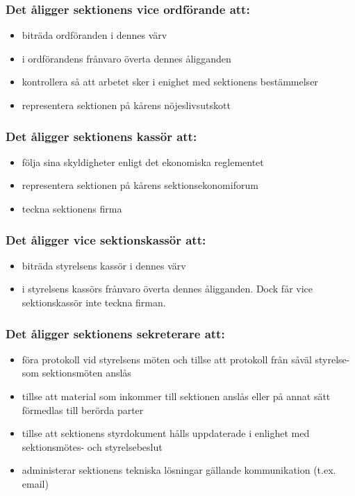 \subsubsection{Det åligger sektionens vice ordförande att:}

\begin{itemize}
  \item biträda ordföranden i dennes värv 
  \item i ordförandens frånvaro överta dennes åligganden 
  \item kontrollera så att arbetet sker i enighet med sektionens bestämmelser 
  \item representera sektionen på kårens nöjeslivsutskott
\end{itemize}

\subsubsection{Det åligger sektionens kassör att:}

\begin{itemize}
  \item följa sina skyldigheter enligt det ekonomiska reglementet
  \item representera sektionen på kårens sektionsekonomiforum
  \item teckna sektionens firma
\end{itemize}

\subsubsection{Det åligger vice sektionskassör att:}

\begin{itemize}
  \item biträda styrelsens kassör i dennes värv
  \item i styrelsens kassörs frånvaro överta dennes åligganden. 
        Dock får vice sektionskassör inte teckna firman.
\end{itemize}

\subsubsection{Det åligger sektionens sekreterare att:}

\begin{itemize}
  \item föra protokoll vid styrelsens möten och tillse att protokoll från såväl styrelse- som sektionsmöten anslås
  \item tillse att material som inkommer till sektionen anslås eller på annat sätt förmedlas till berörda parter
  \item tillse att sektionens styrdokument hålls uppdaterade i enlighet med sektionsmötes- och styrelsebeslut
  \item administerar sektionens tekniska lösningar gällande kommunikation (t.ex. email)
\end{itemize}

